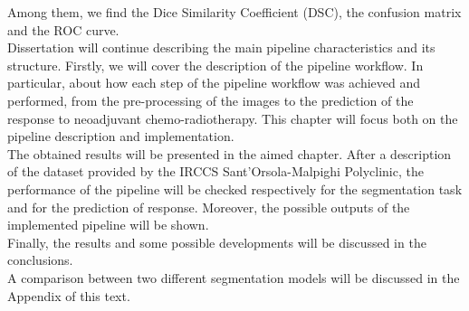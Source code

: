 \documentclass{standalone}
\begin{document}
Among them, we find the Dice Similarity Coefficient (DSC), the confusion matrix and the ROC curve.
\\
Dissertation will continue describing the main pipeline characteristics and its structure.
Firstly, we will cover the description of the pipeline workflow.
In particular, about how each step of the pipeline workflow was achieved and performed, from the pre-processing of the images to the prediction of the response to neoadjuvant chemo-radiotherapy.
This chapter will focus both on the pipeline description and implementation. 
\\
The obtained results will be presented in the aimed chapter.
After a description of the dataset provided by the IRCCS Sant’Orsola-Malpighi Polyclinic, the performance of the pipeline will be checked respectively for the segmentation task and for the prediction of response.
Moreover, the possible outputs of the implemented pipeline will be shown.
\\
Finally, the results and some possible developments will be discussed in the conclusions.
\\
A comparison between two different segmentation models will be discussed in the Appendix of this text.
\end{document}
